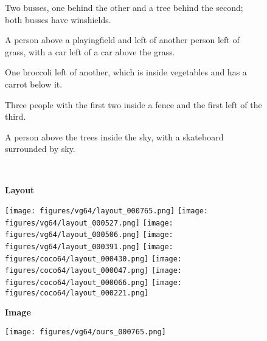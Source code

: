 \documentclass[10pt,twocolumn,letterpaper]{article}
\begin{document}
\begin{figure*}[ht!]
  \begin{minipage}{\qualtext}
    \ssmall
    Two busses, one behind the other and a tree behind the second;
    both busses have winshields.
  \end{minipage}
  \hspace{\qualtextspace}
  \begin{minipage}{\qualtext}
    \ssmall
    A person above a playingfield and left of another person left of grass,
    with a car left of a car above the grass.
  \end{minipage}
  \hspace{\qualtextspace}
  \begin{minipage}{\qualtext}
    \ssmall
    One broccoli left of another, which is inside vegetables
    and has a carrot below it.
  \end{minipage}
  \hspace{\qualtextspace}
  \begin{minipage}{\qualtext}
    \ssmall
    Three people with the first two inside a fence and the first
    left of the third.
  \end{minipage}
  \hspace{\qualtextspace}
  \begin{minipage}{\qualtext}
    \ssmall
    A person above the trees inside the sky, with a skateboard
    surrounded by sky.
  \end{minipage} \\
  \begin{rotate}{90}
    \hspace{4mm}
    \textbf{Layout}
  \end{rotate}
  \hspace*{0.5mm}
  \texttt{[image: figures/vg64/layout\_000765.png]}
  \texttt{[image: figures/vg64/layout\_000527.png]}
  \texttt{[image: figures/vg64/layout\_000506.png]}
  \texttt{[image: figures/vg64/layout\_000391.png]}
  \texttt{[image: figures/coco64/layout\_000430.png]}
  \texttt{[image: figures/coco64/layout\_000047.png]}
  \texttt{[image: figures/coco64/layout\_000066.png]}
  \texttt{[image: figures/coco64/layout\_000221.png]} \\
  \begin{rotate}{90}
    \hspace{6mm}\textbf{Image}
  \end{rotate}
  \hspace*{0.5mm}
  \texttt{[image: figures/vg64/ours\_000765.png]}

\end{figure*}
\end{document}
